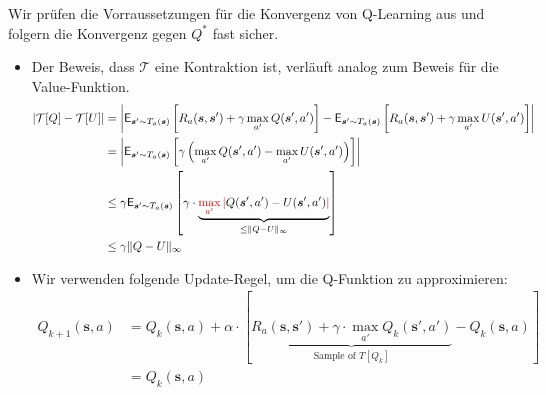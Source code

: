 \begin{beweis}
  Wir prüfen die Vorraussetzungen für die Konvergenz von 
  Q-Learning aus \cite{tsitsiklis1992asynchronous} und folgern die 
  Konvergenz gegen $Q^*$ fast sicher.
  \begin{itemize}
      \item Der Beweis, dass $\mathcal{T}$ eine Kontraktion ist,
      verläuft analog zum Beweis für die Value-Funktion.
      \begin{align*}
          \left| \mathcal{T}[Q] - \mathcal{T}[U] \right|
          &=
          \left|
              \mathsf{E}_{\bm{s}' \sim T_a(\bm{s})}
              \left[
                  \vphantom{\int}
                  R_a(\bm{s}, \bm{s}') + \gamma 
                  \max_{a'} Q(\bm{s}', a')
              \right]
              -
              \mathsf{E}_{\bm{s}' \sim T_a(\bm{s})}
              \left[
                  \vphantom{\int}
                  R_a(\bm{s}, \bm{s}') + \gamma 
                  \max_{a'} U(\bm{s}', a')
              \right]
          \right| \\
          &=
          \left|
              \mathsf{E}_{\bm{s}' \sim T_a(\bm{s})}
              \left[
                  \vphantom{\int}
                  \gamma
                  \left(
                      \max_{a'} Q(\bm{s}', a') - \max_{a'} U(\bm{s}', a')
                  \right)
              \right]
          \right| \\
          &\leq
          \gamma
          \mathsf{E}_{\bm{s}' \sim T_a(\bm{s})}
          \left[
              \vphantom{\int}
              \gamma
              \cdot
              \underbrace{
                  \rot{\max_{a'} |} Q(\bm{s}', a') - U(\bm{s}', a') \rot{|}
              }_{
                  \leq \|Q - U\|_{\infty}
              }
          \right]
          \\
          &\leq
          \gamma \|Q - U\|_{\infty}
      \end{align*}
      \item Wir verwenden folgende Update-Regel, um die Q-Funktion zu approximieren:
      \begin{align*}
          Q_{k+1}(\bm{s}, a) 
          &=  Q_k(\bm{s}, a)
          + \alpha \cdot 
          \left[
              \underbrace{
                  R_a(\bm{s},\bm{s}') + \gamma \cdot \max_{a'} Q_k(\bm{s}', a')
                  }_{\text{Sample of }T[Q_k]} 
              - Q_k(\bm{s}, a)
          \right]
          \\
          &=
          Q_k(\bm{s}, a)

\end{align*}
\end{itemize}
\end{beweis}
